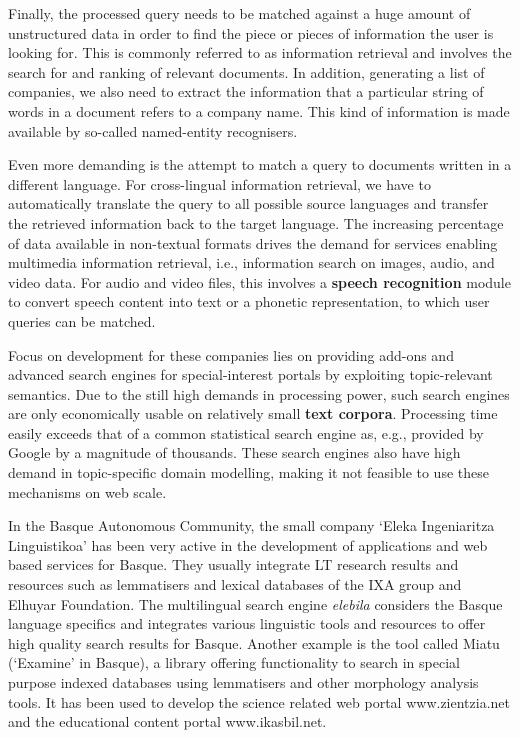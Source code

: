 \begin{multicols}{2}
Finally, the processed query needs to be matched against a huge amount of unstructured data in order to find the piece or pieces of information the user is looking for. This is commonly referred to as 
information retrieval and involves the search for and ranking of relevant documents. In addition, generating a list of companies, we also need to extract the information that a particular string of words in a document refers to a company name. This kind of information is made available by so-called 
named-entity recognisers. 

Even more demanding is the attempt to match a query to documents written in a different language. For 
cross-lingual information retrieval, we have to automatically translate the query to all possible source languages and transfer the retrieved information back to the target language. The increasing percentage of data available in non-textual formats drives the demand for services enabling 
multimedia information retrieval, i.e., information search on images, audio, and video data. For audio and video files, this involves a \textbf{speech recognition} module to convert speech content into text or a phonetic representation, to which user queries can be matched.

Focus on development for these companies lies on providing add-ons and advanced search engines for special-interest portals by exploiting topic-relevant semantics. Due to the still high demands in processing power, such search engines are only economically usable on relatively small \textbf{text corpora}. Processing time easily exceeds that of a common statistical search engine as, e.g., provided by Google by a magnitude of thousands. These search engines also have high demand in topic-specific domain modelling, making it not feasible to use these mechanisms on web scale.

In the Basque Autonomous Community, the small company ‘Eleka Ingeniaritza Linguistikoa’ has been very active in the development of applications and web based services for Basque. They usually integrate LT research results and resources such as lemmatisers and lexical databases of the IXA group and Elhuyar Foundation. The multilingual search engine \textit{elebila} considers the Basque language specifics and integrates various linguistic tools and resources to offer high quality search results for Basque. Another example is the tool called Miatu (‘Examine’ in Basque), a library offering functionality to search in special purpose indexed databases using lemmatisers and other morphology analysis tools. It has been used to develop the science related web portal www.zientzia.net and the educational content portal www.ikasbil.net.


\end{multicols}
